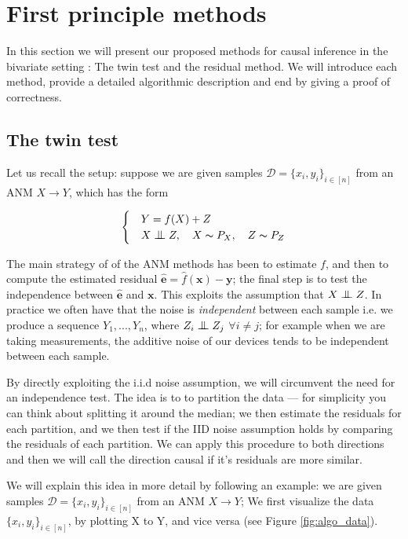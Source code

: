 
\chapter{First principle methods}


In this section we will present our proposed methods for causal inference in the 
bivariate setting : The twin test and the residual method. We will introduce each method, 
provide a detailed algorithmic description and end by giving a proof of correctness. 


\section{The twin test}

Let us recall the setup: 
suppose we are given samples $\mathcal{D} = \{x_i, y_i\}_{i \in [n]}$ from an ANM $X \rightarrow Y$, which has the form

\[
    \begin{cases} 
        & Y = f(X) + Z \\
        & X \bigCI Z,\quad X \thicksim P_X,\quad Z \thicksim P_{Z}  
     \end{cases}  
\]

The main strategy of of the ANM methods has been to estimate $f$, and then to compute the estimated
residual $\hat{\mathbf{e}} = \hat{f}(\mathbf{x}) - \mathbf{y}$; the final step is to test the independence between $\hat{\mathbf{e}}$ and $\mathbf{x}$. This exploits 
the assumption that $X \bigCI Z$. In practice we often have that the noise is \textit{independent} between each sample
i.e. we produce a sequence $Y_1, ..., Y_n$, where $Z_i \bigCI Z_j$ $\forall i \neq j$; for example when we are 
taking measurements, the additive noise of our devices tends to be independent between each sample.

By directly exploiting the i.i.d noise assumption, we will circumvent the need for an independence test. The 
idea is to to partition the data ---  for simplicity you can think about splitting it around the median; we 
then estimate the residuals for each partition, and we then test if the IID noise assumption holds by comparing
the residuals of each partition. We can apply this procedure to both directions and then we will call the 
direction causal if it's residuals are more similar. 

We will explain this idea in more detail by following an example: we are given samples 
$\mathcal{D} = \{x_i, y_i\}_{i \in [n]}$ from an ANM $X \rightarrow Y$; 
We first visualize the data $\{x_i, y_i\}_{i \in [n]}$, by plotting
X to Y, and vice versa (see Figure \ref{fig:algo_data}). 

